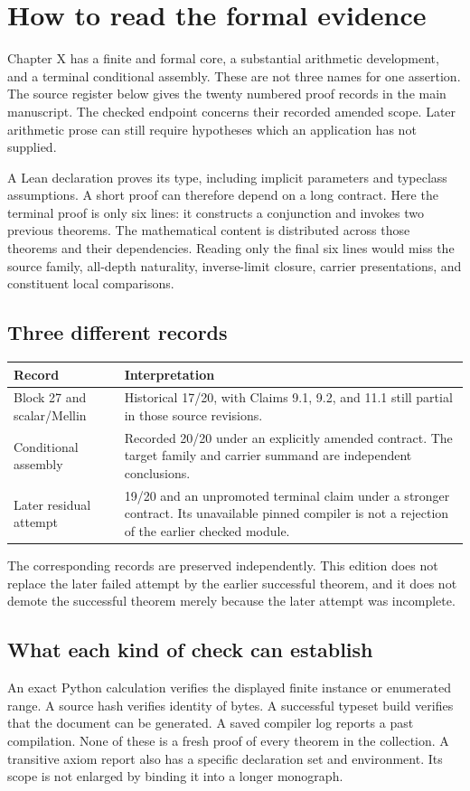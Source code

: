 \section{How to read the formal evidence}
\label{sec:evidence-reading}
Chapter X has a finite and formal core, a substantial arithmetic development, and a
terminal conditional assembly. These are not three names for one assertion.
The source register below gives the twenty numbered proof records in the main
manuscript. The checked endpoint concerns their recorded amended scope. Later
arithmetic prose can still require hypotheses which an application has not supplied.

A Lean declaration proves its type, including implicit parameters and typeclass
assumptions. A short proof can therefore depend on a long contract. Here the
terminal proof is only six lines: it constructs a conjunction and invokes two
previous theorems. The mathematical content is distributed across those theorems
and their dependencies. Reading only the final six lines would miss the source
family, all-depth naturality, inverse-limit closure, carrier presentations, and
constituent local comparisons.

\subsection{Three different records}
\begin{longtable}{@{}p{.20\linewidth}p{.75\linewidth}@{}}\toprule
Record & Interpretation\\\midrule
Block 27 and scalar/Mellin & Historical 17/20, with Claims 9.1, 9.2, and 11.1 still partial in those source revisions.\\
Conditional assembly & Recorded 20/20 under an explicitly amended contract. The target family and carrier summand are independent conclusions.\\
Later residual attempt & 19/20 and an unpromoted terminal claim under a stronger contract. Its unavailable pinned compiler is not a rejection of the earlier checked module.\\\bottomrule
\end{longtable}
The corresponding records are preserved independently. This edition does not
replace the later failed attempt by the earlier successful theorem, and it does
not demote the successful theorem merely because the later attempt was incomplete.

\subsection{What each kind of check can establish}
An exact Python calculation verifies the displayed finite instance or enumerated
range. A source hash verifies identity of bytes. A successful typeset build verifies
that the document can be generated. A saved compiler log reports a past
compilation. None of these is a fresh proof of every theorem in the collection.
A transitive axiom report also has a specific declaration set and environment.
Its scope is not enlarged by binding it into a longer monograph.

